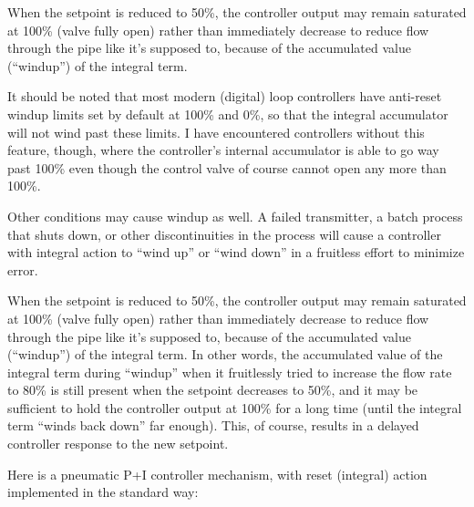 When the setpoint is reduced to 50\%, the controller output may remain saturated at 100\% (valve fully open) rather than immediately decrease to reduce flow through the pipe like it's supposed to, because of the accumulated value (``windup'') of the integral term. 

\vskip 10pt

It should be noted that most modern (digital) loop controllers have anti-reset windup limits set by default at 100\% and 0\%, so that the integral accumulator will not wind past these limits.  I have encountered controllers without this feature, though, where the controller's internal accumulator is able to go way past 100\% even though the control valve of course cannot open any more than 100\%.







Other conditions may cause windup as well.  A failed transmitter, a batch process that shuts down, or other discontinuities in the process will cause a controller with integral action to ``wind up'' or ``wind down'' in a fruitless effort to minimize error.

When the setpoint is reduced to 50\%, the controller output may remain saturated at 100\% (valve fully open) rather than immediately decrease to reduce flow through the pipe like it's supposed to, because of the accumulated value (``windup'') of the integral term.  In other words, the accumulated value of the integral term during ``windup'' when it fruitlessly tried to increase the flow rate to 80\% is still present when the setpoint decreases to 50\%, and it may be sufficient to hold the controller output at 100\% for a long time (until the integral term ``winds back down'' far enough).  This, of course, results in a delayed controller response to the new setpoint.






Here is a pneumatic P+I controller mechanism, with reset (integral) action implemented in the standard way:

